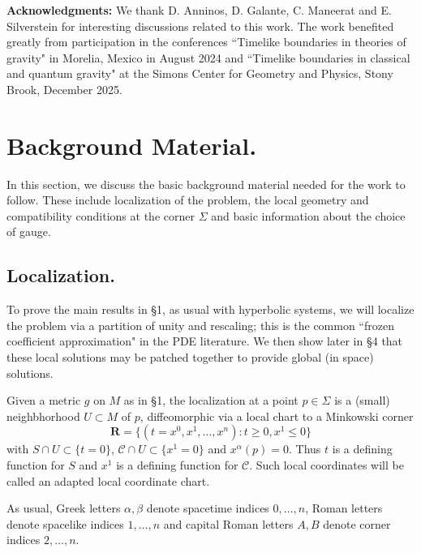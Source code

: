 \documentclass[10pt]{amsart}
\renewcommand{\a}{\alpha}
\renewcommand{\b}{\beta}
\newcommand{\Si}{\Sigma}
\newcommand{\cC}{{\mathcal C}}
\newcommand{\<}{\langle}
\renewcommand{\>}{\rangle}
\theoremstyle{plain}
\theoremstyle{remark}
\theoremstyle{definition}
\numberwithin{equation}{section}
\begin{document}
 \medskip 
 
{\bf Acknowledgments:} We thank D. Anninos, D. Galante, C. Maneerat and E. Silverstein for interesting discussions related to this work. 
The work benefited greatly from participation in the conferences ``Timelike boundaries in theories of gravity" in Morelia, Mexico in 
August 2024 and ``Timelike boundaries in classical and quantum gravity" at the Simons Center for Geometry and Physics, Stony Brook, December 2025.
 
 
 \section{Background Material.}

  In this section, we discuss the basic background material needed for the work to follow. These include localization of the problem, 
the local geometry and compatibility conditions at the corner $\Si$ and basic information about the choice of gauge. 

\subsection{Localization.} 
 To prove the main results in \S 1, as usual with hyperbolic systems, we will localize the problem via a partition of unity and rescaling; 
this is the common ``frozen coefficient approximation" in the PDE literature. We then show later in \S 4 that these local solutions may be patched 
together to provide global (in space) solutions. 

  Given a metric $g$ on $M$ as in \S 1, the localization at a point $p \in \Si$ is a (small) neighbhorhood $U \subset M$ of $p$, diffeomorphic via 
a local chart to a Minkowski corner 
$$\mathbf R=\{(t=x^0,x^1,\dots ,x^n):t\geq 0, x^1\leq 0\}$$ 
with $S\cap U \subset \{t = 0\}$, $\cC \cap U \subset \{x^1 = 0\}$ and $x^{\a}(p) = 0$. Thus $t$ is a defining function for $S$ and $x^1$ is a 
defining function for $\cC$. Such local coordinates will be called an adapted local coordinate chart.  

As usual, Greek letters $\a, \b$ denote spacetime indices $0, \dots, n$, Roman letters denote spacelike indices $1, \dots, n$ and 
capital Roman letters $A,B$ denote corner indices $2, \dots, n$. 
\end{document}
